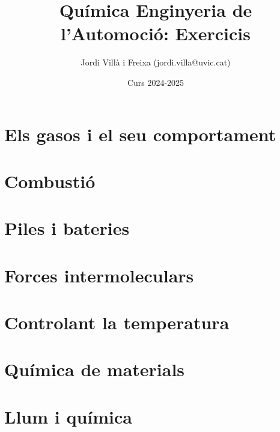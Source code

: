 \documentclass[12pt]{article}
\title{Química Enginyeria de l'Automoció: Exercicis}
\date{Curs 2024-2025}
\author{Jordi Vill\`a i Freixa (jordi.villa@uvic.cat)}
\begin{document}
\maketitle
\tableofcontents
\section{Els gasos i el seu comportament}


\section{Combustió}

\section{Piles i bateries}

\section{Forces intermoleculars}

\section{Controlant la temperatura}

\section{Química de materials}

\section{Llum i química}

\printbibliography
\end{document}
